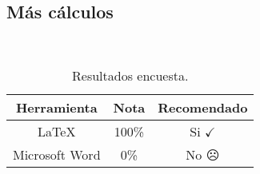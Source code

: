 \begin{appendixd}
	\section{Más cálculos}

	\lipsum[1] \\
	\lipsum[4]

	\begin{table}[H]
		\centering
		\caption{Resultados encuesta.}
		\begin{tabular}{ccc}
			\hline
			\textbf{Herramienta} & \textbf{Nota} & \textbf{Recomendado} \bigstrut\\
			\hline
			\LaTeX & 100\% & Si $\checkmark$ \\
			Microsoft Word \textsuperscript{\textregistered} & 0\% & No $\frownie$\\
			\hline
		\end{tabular}
		\label{tab:anexo-2}
	\end{table}

\end{appendixd}